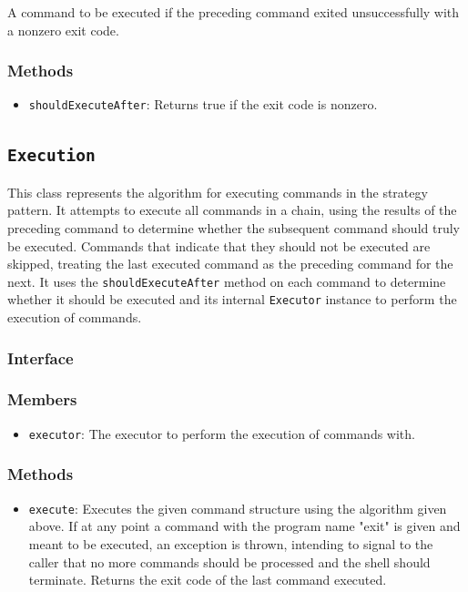 \documentclass{article}
\begin{document}
  A command to be executed if the preceding command exited
  unsuccessfully with a nonzero exit code.

  \subsubsection{Methods}
  \begin{itemize}
    \item \texttt{shouldExecuteAfter}: Returns true if the exit code is
      nonzero.
  \end{itemize}

  \subsection{\texttt{Execution}}

  This class represents the algorithm for executing commands in the
  strategy pattern.  It attempts to execute all commands in a chain,
  using the results of the preceding command to determine whether the
  subsequent command should truly be executed.  Commands that indicate
  that they should not be executed are skipped, treating the last
  executed command as the preceding command for the next.  It uses the
  \texttt{shouldExecuteAfter} method on each command to determine
  whether it should be executed and its internal \texttt{Executor}
  instance to perform the execution of commands.

  \subsubsection{Interface}
  

  \subsubsection{Members}
  \begin{itemize}
    \item \texttt{executor}: The executor to perform the execution of
      commands with.
  \end{itemize}

  \subsubsection{Methods}
  \begin{itemize}
    \item \texttt{execute}: Executes the given command structure using
      the algorithm given above.  If at any point a command with the
      program name "exit" is given and meant to be executed, an
      exception is thrown, intending to signal to the caller that no
      more commands should be processed and the shell should terminate.
      Returns the exit code of the last command executed.
  \end{itemize}
\end{document}
